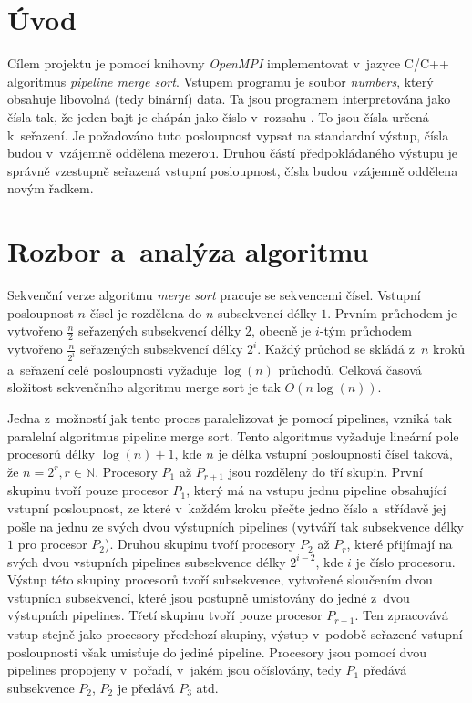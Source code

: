 \documentclass[a4paper, 12pt]{article}[21.3.2015]
\begin{document}


\tableofcontents

\clearpage
\section{Úvod} \label{introduction}
Cílem projektu je pomocí knihovny \emph{OpenMPI} implementovat v~jazyce C/C++ algoritmus \emph{pipeline merge sort}. Vstupem programu je soubor \emph{numbers}, který obsahuje libovolná (tedy binární) data. Ta jsou programem interpretována jako čísla tak, že jeden bajt je chápán jako číslo v~rozsahu \(<0-255>\). To jsou čísla určená k~seřazení. Je požadováno tuto posloupnost vypsat na standardní výstup, čísla budou v~vzájemně oddělena mezerou. Druhou částí předpokládaného výstupu je správně vzestupně seřazená vstupní posloupnost, čísla budou vzájemně oddělena novým řadkem.

\section{Rozbor a~analýza algoritmu} \label{analysis}
Sekvenční verze algoritmu \emph{merge sort} pracuje se sekvencemi čísel. Vstupní posloupnost \(n\) čísel je rozdělena do \(n\) subsekvencí délky \(1\). Prvním průchodem je vytvořeno \(\frac{n}{2}\) seřazených subsekvencí délky \(2\), obecně je \(i\)-tým průchodem vytvořeno \(\frac{n}{2^i}\) seřazených subsekvencí délky \(2^i\). Každý průchod se skládá z~\(n\) kroků a~seřazení celé posloupnosti vyžaduje \(\log(n)\) průchodů. Celková časová složitost sekvenčního algoritmu merge sort je tak \(O(n\log(n))\).

Jedna z~možností jak tento proces paralelizovat je pomocí pipelines, vzniká tak paralelní algoritmus pipeline merge sort. Tento algoritmus vyžaduje lineární pole procesorů délky \(\log(n) + 1\), kde \(n\) je délka vstupní posloupnosti čísel taková, že \(n = 2^r, r \in \mathbb{N}\). Procesory \(P_1\) až \(P_{r + 1}\) jsou rozděleny do tří skupin. První skupinu tvoří pouze procesor \(P_1\), který má na vstupu jednu pipeline obsahující vstupní posloupnost, ze které v~každém kroku přečte jedno číslo a~střídavě jej pošle na jednu ze svých dvou výstupních pipelines (vytváří tak subsekvence délky \(1\) pro procesor \(P_2\)). Druhou skupinu tvoří procesory \(P_2\) až \(P_r\), které přijímají na svých dvou vstupních pipelines subsekvence délky \(2^{i-2}\), kde \(i\) je číslo procesoru. Výstup této skupiny procesorů tvoří subsekvence, vytvořené sloučením dvou vstupních subsekvencí, které jsou postupně umisťovány do jedné z~dvou výstupních pipelines. Třetí skupinu tvoří pouze procesor \(P_{r + 1}\). Ten zpracovává vstup stejně jako procesory předchozí skupiny, výstup v~podobě seřazené vstupní posloupnosti však umisťuje do jediné pipeline. Procesory jsou pomocí dvou pipelines propojeny v~pořadí, v~jakém jsou očíslovány, tedy \(P_1\) předává subsekvence \(P_2\), \(P_2\) je předává \(P_3\) atd.
\end{document}
